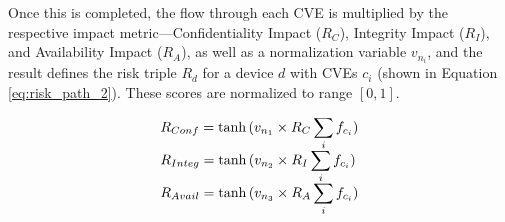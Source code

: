 Once this is completed, the flow through each CVE is multiplied by the respective impact metric---Confidentiality Impact ($R_C$), Integrity Impact ($R_I$), and Availability Impact ($R_A$), as well as a normalization variable $v_{n_i}$, and the result defines the risk triple $R_d$ for a device $d$ with CVEs $c_i$ (shown in Equation \ref{eq:risk_path_2}). These scores are normalized to range $[0,1]$.

\begin{equation}
\begin{array}{ll@{}ll}
R_{Conf} = \tanh{(v_{n_1}\times R_C\displaystyle\sum_{i} f_{c_i})} \\
R_{Integ} = \tanh{(v_{n_2}\times R_I\displaystyle\sum_{i} f_{c_i})} \\
R_{Avail} = \tanh{(v_{n_3}\times R_A\displaystyle\sum_{i} f_{c_i})} \\
\end{array}
\label{eq:risk_path_2}
\end{equation}